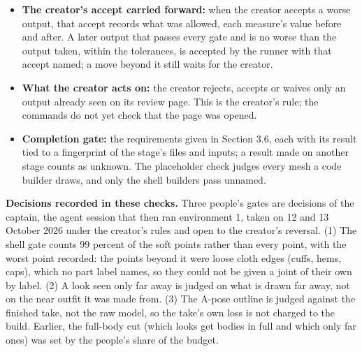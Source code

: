 \begin{itemize}
\item
  \textbf{The creator's accept carried forward:} when the creator accepts a worse output, that accept records what was allowed, each measure's value before and after. A later output that passes every gate and is no worse than the output taken, within the tolerances, is accepted by the runner with that accept named; a move beyond it still waits for the creator.
\item
  \textbf{What the creator acts on:} the creator rejects, accepts or waives only an output already seen on its review page. This is the creator's rule; the commands do not yet check that the page was opened.
\item
  \textbf{Completion gate:} the requirements given in Section 3.6, each with its result tied to a fingerprint of the stage's files and inputs; a result made on another stage counts as unknown. The placeholder check judges every mesh a code builder draws, and only the shell builders pass unnamed.
\end{itemize}

\textbf{Decisions recorded in these checks.} Three people's gates are decisions of the captain, the agent session that then ran environment 1, taken on 12 and 13 October 2026 under the creator's rules and open to the creator's reversal. (1) The shell gate counts 99 percent of the soft points rather than every point, with the worst point recorded: the points beyond it were loose cloth edges (cuffs, hems, caps), which no part label names, so they could not be given a joint of their own by label. (2) A look seen only far away is judged on what is drawn far away, not on the near outfit it was made from. (3) The A-pose outline is judged against the finished take, not the raw model, so the take's own loss is not charged to the build. Earlier, the full-body cut (which looks get bodies in full and which only far ones) was set by the people's share of the budget.
